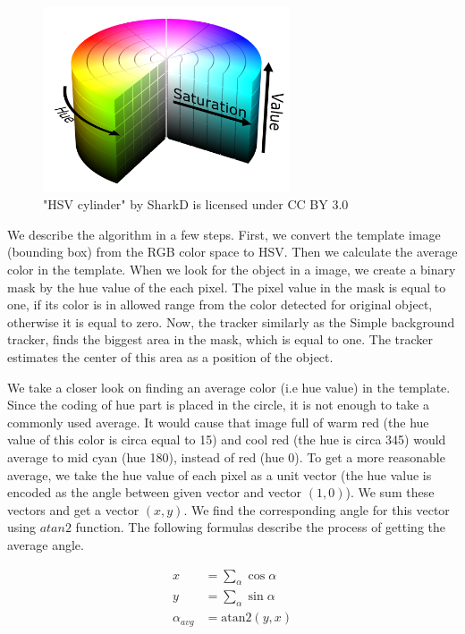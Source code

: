 \begin{figure}[h!]\centering
\includegraphics[width=0.65\textwidth]{img/hsv-cylinder.png}
\caption["HSV cylinder" by SharkD is licensed under CC BY 3.0]{"HSV cylinder" by SharkD is licensed under CC BY 3.0 \protect\footnotemark}
\end{figure}

We describe the algorithm in a few steps. First, we convert the template image
(bounding box) from the RGB color space to HSV. Then we calculate the average
color in the template. When we look for the object in a image, we create a
binary mask by the hue value of the each pixel. The pixel value in the mask is
equal to one, if its color is in allowed range from the color detected for
original object, otherwise it is equal to zero. Now, the tracker similarly as
the Simple background tracker, finds the biggest area in the mask, which is equal to
one. The tracker estimates the center of this area as a position of the object.

We take a closer look on finding an average color (i.e hue value) in the
template.  Since the coding of hue part is placed in the circle, it is not
enough to take a commonly used average. It would cause that image full of warm
red (the hue value of this color is circa equal to 15) and cool red (the hue is
circa 345) would average to mid cyan (hue 180), instead of red (hue 0). To get
a more reasonable average, we take the hue value of each pixel as a unit vector
(the hue value is encoded as the angle between given vector and vector $(1,
0)$). We sum these vectors and get a vector $(x, y)$. We find the corresponding
angle for this vector using $atan2$ function. The following formulas describe
the process of getting the average angle.

$$
\begin{aligned}
x &= \sum_\alpha \cos \alpha \\
y &= \sum_\alpha \sin \alpha \\
\alpha_{avg} &= \text{atan2}(y, x)
\end{aligned}
$$

